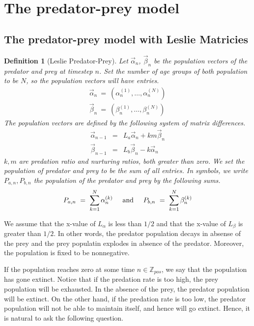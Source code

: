 \documentclass{article}
\newcommand{\textAnd}{
    {
        \hspace{5mm}
        \textrm{and}
        \hspace{5mm}
    }
}
\newtheorem{definition}{Definition}[section]
\newtheorem{definition}{Definition}
\numberwithin{equation}{section}
\begin{document}
\section{The predator-prey model}
\subsection{The predator-prey model with Leslie Matricies}

\begin{definition}[Leslie Predator-Prey]
Let $\vec \alpha_n$, $\vec \beta_n$ be the population vectors 
of the predator and prey at timestep $n$. 
Set the number of age groups of both population to be 
$N$, so the population vectors will have entries. 
\begin{eqnarray}
    \vec \alpha_n \ = \ (\alpha_n^{(1)}, \dots, \alpha_n^{(N)}) 
    \nonumber \\
    \vec \beta_n \ = \ (\beta_n^{(1)}, \dots, \beta_n^{(N)}) 
\end{eqnarray}
 The population 
vectors are defined by the following 
system of matrix differences. 
\begin{eqnarray}
    \vec \alpha_{n - 1} &=& L_a \vec \alpha_n + k m \vec \beta_n \nonumber \\ 
    \vec \beta_{n - 1} &=& L_b \vec \beta_n - k \vec \alpha_n
\end{eqnarray}
$k, m$ are predation ratio and nurturing ratios, both greater than zero. 
We set the population of predator and prey to be the sum 
of all entries. In symbols, we write $P_{a, n}, P_{b, n}$ the population 
of the predator and prey by the following sums. 
\begin{equation}
    P_{a, n} \ = \ \sum_{k = 1}^{N} \alpha^{(k)}_{n}  
    \textAnd
    P_{b, n} \ = \ \sum_{k = 1}^{N} \beta^{(k)}_{n} 
\end{equation}
\end{definition}


We assume that the x-value of $L_\alpha$ is less than $1/2$ 
and that the x-value of $L_\beta$ is greater than $1/2$. In 
other words, the predator population decays in absense of the prey 
and the prey populatin explodes in absence of the predator. 
Moreover, the population is fixed to be nonnegative. 

If the population reaches zero 
at some time $n \in \mathbb{Z}_{pos}$, 
we say that the population has gone 
extinct. 
Notice that if the predation rate is too high, the prey population 
will be exhausted. In the absence of the prey, the predator 
population will be extinct. On the other hand, if the predation 
rate is too low, the predator population will not be able to maintain 
itself, and hence will go extinct. Hence, it is natural to ask 
the following question. 
\end{document}
